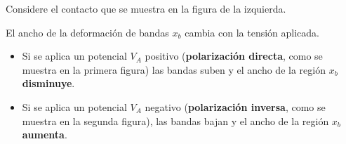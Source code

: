 \documentclass[10pt,t,aspectratio=169]{beamer}
\begin{document}
\begin{frame}[t]
\begin{columns}
\begin{column}{0.6\textwidth}
            Considere el contacto que se muestra en la figura de la izquierda.

            \vspace{3mm}
            El ancho de la deformación de bandas $x_b$ cambia con la tensión aplicada.

            \vspace{3mm}
            \begin{itemize}
                \item Si se aplica un potencial $V_A$ positivo (\textbf{polarización directa}, como se muestra en la primera figura) las bandas suben y el ancho de la región $x_b$ \textbf{disminuye}.
                \item Si se aplica un potencial $V_A$ negativo (\textbf{polarización inversa}, como se muestra en la segunda figura), las bandas bajan y el ancho de la región $x_b$ \textbf{aumenta}.
            \end{itemize}
            
        \end{column}
        
    \end{columns}
    
\end{frame}
\end{document}
